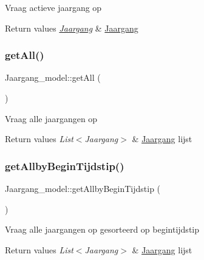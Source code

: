Vraag actieve jaargang op 
\begin{DoxyRetVals}{Return values}
{\em \mbox{\hyperlink{class_jaargang}{Jaargang}}} & \mbox{\hyperlink{class_jaargang}{Jaargang}} \\
\hline
\end{DoxyRetVals}
\mbox{\label{class_jaargang__model_a25674521a1a6a191c6cc77e524e5b8f5}} 
\subsubsection{\texorpdfstring{get\+All()}{getAll()}}
{\footnotesize\ttfamily Jaargang\+\_\+model\+::get\+All (\begin{DoxyParamCaption}{ }\end{DoxyParamCaption})}

Vraag alle jaargangen op 
\begin{DoxyRetVals}{Return values}
{\em List$<$\+Jaargang$>$} & \mbox{\hyperlink{class_jaargang}{Jaargang}} lijst \\
\hline
\end{DoxyRetVals}
\mbox{\label{class_jaargang__model_aba56cc05b3878d487d723edfe4464803}} 
\subsubsection{\texorpdfstring{get\+Allby\+Begin\+Tijdstip()}{getAllbyBeginTijdstip()}}
{\footnotesize\ttfamily Jaargang\+\_\+model\+::get\+Allby\+Begin\+Tijdstip (\begin{DoxyParamCaption}{ }\end{DoxyParamCaption})}

Vraag alle jaargangen op gesorteerd op begintijdstip 
\begin{DoxyRetVals}{Return values}
{\em List$<$\+Jaargang$>$} & \mbox{\hyperlink{class_jaargang}{Jaargang}} lijst \\
\hline
\end{DoxyRetVals}
\mbox{\label{class_jaargang__model_ab77c5c935c05d5bc08630111f3f0273f}} 
